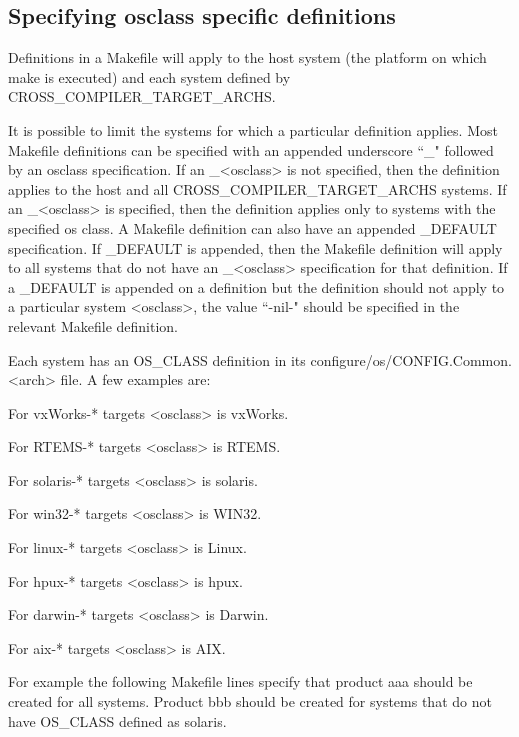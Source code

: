 \subsection{Specifying osclass specific definitions}

Definitions in a Makefile will apply to the host system (the platform on which make is executed) and each system defined 
by CROSS\_COMPILER\_TARGET\_ARCHS.

It is possible to limit the systems for which a particular definition applies. Most Makefile definitions can be specified with 
an appended underscore ``\_" followed by an osclass specification. If an \_\textless{}osclass\textgreater{} is not specified, then the definition 
applies to the host and all CROSS\_COMPILER\_TARGET\_ARCHS systems. If an \_\textless{}osclass\textgreater{} is specified, then the 
definition applies only to systems with the specified os class. A Makefile definition can also have an appended 
\_DEFAULT specification. If \_DEFAULT is appended, then the Makefile definition will apply to all systems that do not 
have an \_\textless{}osclass\textgreater{} specification for that definition. If a \_DEFAULT is appended on a definition but the definition should 
not apply to a particular system \textless{}osclass\textgreater{}, the value ``-nil-" should be specified in the relevant Makefile definition.

Each system has an OS\_CLASS definition in its configure/os/CONFIG.Common.\textless{}arch\textgreater{} file. A few examples are:

\begin{description}\item For vxWorks-* targets \textless{}osclass\textgreater{} is vxWorks.

\item For RTEMS-* targets \textless{}osclass\textgreater{} is RTEMS.

\item For solaris-* targets \textless{}osclass\textgreater{} is solaris.

\item For win32-* targets \textless{}osclass\textgreater{} is WIN32.

\item For linux-* targets \textless{}osclass\textgreater{} is Linux.

\item For hpux-* targets \textless{}osclass\textgreater{} is hpux.

\item For darwin-* targets \textless{}osclass\textgreater{} is Darwin.

\item For aix-* targets \textless{}osclass\textgreater{} is AIX.

\end{description}For example the following Makefile lines specify that product aaa should be created for all systems. Product bbb should 
be created for systems that do not have OS\_CLASS defined as solaris.

